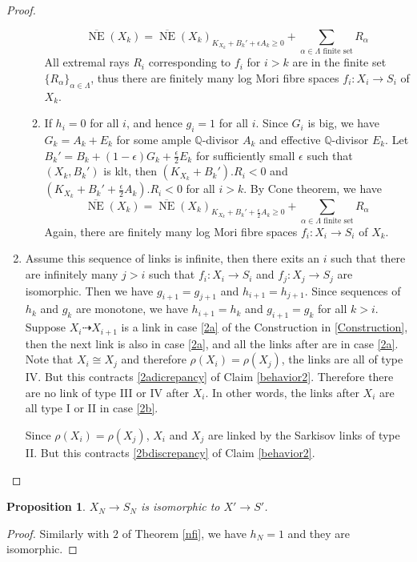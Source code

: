 \documentclass[11pt]{amsart}
\newtheorem{prop}[defn]{Proposition}
\begin{document}
\begin{proof}
\begin{enumerate}
\begin{enumerate}
  \[
    \overline{\operatorname{NE}}(X_{k})=\overline{\operatorname{NE}}(X_{k})_{K_{X_{k}}+B_{k}'+\epsilon A_{k}\geqslant 0} +\sum_{\alpha \in\Lambda\text{ finite set}}R_{\alpha}
  \]
  All extremal rays $R_{i}$ corresponding to $f_{i}$ for $i>k$ are in the finite set $\{R_{\alpha}\}_{\alpha \in \Lambda} $, thus there are finitely many log Mori fibre spaces $f_{i}:X_{i}\to S_{i}$ of $X_{k}$.
\item If $h_{i}=0$ for all $i$, and hence $g_{i}=1$ for all $i$. Since $G_{i}$ is big, we have $G_{k}=A_{k}+E_{k}$ for some ample $\mathbb{Q}$-divisor $A_{k}$ and effective $\mathbb{Q}$-divisor $E_{k}$. Let $B_{k}'=B_{k}+(1-\epsilon)G_{k}+\frac{\epsilon}{2} E_{k}$ for sufficiently small $\epsilon$ such that $(X_{k},B_{k}')$ is klt, then $(K_{X_{k}}+B_{k}').R_{i}<0$ and $(K_{X_{k}}+B_{k}'+\frac{\epsilon}{2} A_{k}).R_{i}<0$ for all $i>k$. By Cone theorem, we have 
\[
    \overline{\operatorname{NE}}(X_{k})=\overline{\operatorname{NE}}(X_{k})_{K_{X_{k}}+B_{k}'+\frac{\epsilon}{2}A_{k}\geqslant 0} +\sum_{\alpha \in\Lambda\text{ finite set}}R_{\alpha}
  \]
  Again, there are finitely many log Mori fibre spaces $f_{i}:X_{i}\to S_{i}$ of $X_{k}$.

\end{enumerate}
\item Assume this sequence of links is infinite, then there exits an  $i$ such that there are infinitely many $j>i$ such that $f_{i}:X_{i}\to S_{i}  $ and $f_{j}:X_{j}\to S_{j}$ are isomorphic. Then we have $g_{i+1}=g_{j+1}$ and $h_{i+1}=h_{j+1}$. Since sequences of $h_{k}$ and $g_{k}$ are monotone, we have $h_{i+1}=h_{k}$ and  $g_{i+1}=g_{k}$ for all $k>i$. Suppose $X_{i}\dashrightarrow X_{i+1}$ is a link in case \ref{2a} of the Construction in \ref{Construction}, then the next link is also in case \ref{2a}, and all the links after are in case \ref{2a}. Note that $X_{i}\cong X_{j}$ and therefore $\rho(X_{i})=\rho(X_{j})$, the links are all of type IV. But this contracts  \ref{2adicrepancy} of Claim \ref{behavior2}. Therefore there are no link of type III or IV after $X_{i}$. In other words, the links after $X_{i}$ are all type I or II in case \ref{2b}.

  Since $\rho(X_{i})= \rho(X_{j})$, $X_{i}$  and $X_{j}$ are linked by  the Sarkisov links of type II. But this contracts  \ref{2bdiscrepancy} of  Claim \ref{behavior2}.
\end{enumerate}  
\end{proof}
\begin{prop}\label{nfi2}
$X_{N}\to S_{N}$ is isomorphic to $X'\to S'$. 
\end{prop}
\begin{proof}
  Similarly with $2$ of Theorem \ref{nfi}, we have $h_{N}=1$ and they are isomorphic.
\end{proof}
\end{document}
